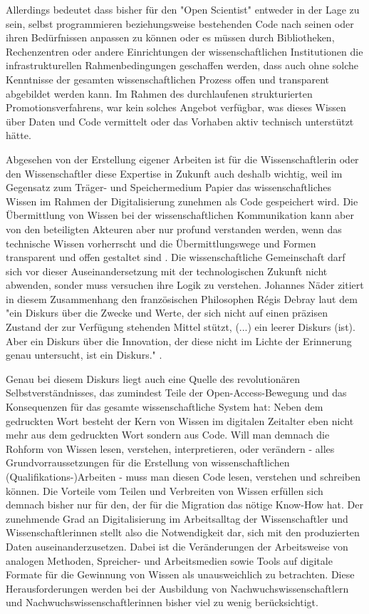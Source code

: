 Allerdings bedeutet dass bisher für den "Open Scientist" entweder in der Lage zu sein, selbst programmieren beziehungsweise bestehenden Code nach seinen oder ihren Bedürfnissen anpassen zu können oder es müssen durch Bibliotheken, Rechenzentren oder andere Einrichtungen der wissenschaftlichen Institutionen die infrastrukturellen Rahmenbedingungen geschaffen werden, dass auch ohne solche Kenntnisse der gesamten wissenschaftlichen Prozess offen und transparent abgebildet werden kann. Im Rahmen des durchlaufenen strukturierten Promotionsverfahrens, war kein solches Angebot verfügbar, was dieses Wissen über Daten und Code vermittelt oder das Vorhaben aktiv technisch unterstützt hätte.

Abgesehen von der Erstellung eigener Arbeiten ist für die Wissenschaftlerin oder den Wissenschaftler diese Expertise in Zukunft auch deshalb wichtig, weil im Gegensatz zum Träger- und Speichermedium Papier das wissenschaftliches Wissen im Rahmen der Digitalisierung zunehmen als Code gespeichert wird. Die Übermittlung von Wissen bei der wissenschaftlichen Kommunikation kann aber von den beteiligten Akteuren aber nur profund verstanden werden, wenn das technische Wissen vorherrscht und die Übermittlungswege und Formen transparent und offen gestaltet sind \cite{davis_2011_open}. Die wissenschaftliche Gemeinschaft darf sich vor dieser Auseinandersetzung mit der technologischen Zukunft nicht abwenden, sonder muss versuchen ihre Logik zu verstehen. Johannes Näder zitiert in diesem Zusammenhang den französischen Philosophen Régis Debray laut dem "ein Diskurs über die Zwecke und Werte, der sich nicht auf einen präzisen Zustand der zur Verfügung stehenden Mittel stützt, (...) ein leerer Diskurs (ist). Aber ein Diskurs über die Innovation, der diese nicht im Lichte der Erinnerung genau untersucht, ist ein Diskurs." \cite[:117]{naeder_2010_open} \cite[:246]{debray2003einfuhrung}.

Genau bei diesem Diskurs liegt auch eine Quelle des revolutionären Selbstverständnisses, das zumindest Teile der Open-Access-Bewegung und das Konsequenzen für das gesamte wissenschaftliche System hat: Neben dem gedruckten Wort besteht der Kern von Wissen im digitalen Zeitalter eben nicht mehr aus dem gedruckten Wort sondern aus Code. Will man demnach die Rohform von Wissen lesen, verstehen, interpretieren, oder verändern - alles Grundvorraussetzungen für die Erstellung von wissenschaftlichen (Qualifikations-)Arbeiten - muss man diesen Code lesen, verstehen und schreiben können. Die Vorteile vom Teilen und Verbreiten von Wissen erfüllen sich demnach bisher nur für den, der für die Migration das nötige Know-How hat. Der zunehmende Grad an Digitalisierung im Arbeitsalltag der Wissenschaftler und Wissenschaftlerinnen stellt also die Notwendigkeit dar, sich mit den produzierten Daten auseinanderzusetzen. Dabei ist die Veränderungen der Arbeitsweise von analogen Methoden, Spreicher- und Arbeitsmedien sowie Tools auf digitale Formate für die Gewinnung von Wissen als unausweichlich zu betrachten. Diese Herausforderungen werden bei der Ausbildung von Nachwuchswissenschaftlern und Nachwuchswissenschaftlerinnen bisher viel zu wenig berücksichtigt.

